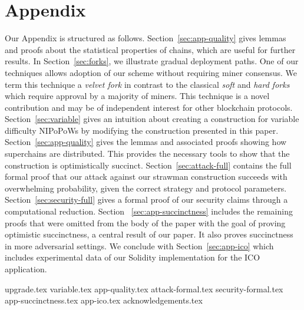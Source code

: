 \appendix
\section*{Appendix}

Our Appendix is structured as follows.
Section~\ref{sec:app-quality} gives lemmas and proofs about the statistical
properties of chains, which are useful for further results.
In Section~\ref{sec:forks}, we illustrate
gradual deployment paths. One of our techniques allows adoption of our scheme
without requiring miner consensus. We term this technique a \emph{velvet fork}
in contrast to the classical \emph{soft} and \emph{hard forks} which require
approval by a majority of miners. This technique is a novel contribution and may
be of independent interest for other blockchain protocols.
Section~\ref{sec:variable} gives an intuition about creating a construction for
variable difficulty NIPoPoWs by modifying the construction presented in this
paper.
Section~\ref{sec:app-quality} gives the lemmas and associated proofs showing how
superchains are distributed. This provides the necessary tools to show that the
construction is optimistically succinct.
Section~\ref{sec:attack-full} contains
the full formal proof that our attack against our strawman construction succeeds with overwhelming probability, given the correct
strategy and protocol parameters. Section~\ref{sec:security-full} gives a formal
proof of our security claims through a computational reduction. Section~
\ref{sec:app-succinctness} includes the remaining proofs that were omitted from
the body of the paper with the goal of proving optimistic succinctness, a
central result of our paper. It also proves succinctness in more adversarial
settings. We conclude with
Section~\ref{sec:app-ico} which includes experimental data of our Solidity
implementation for the ICO application.

{upgrade.tex}
{variable.tex}
{app-quality.tex}
{attack-formal.tex}
{security-formal.tex}
{app-succinctness.tex}
{app-ico.tex}
{acknowledgements.tex}
